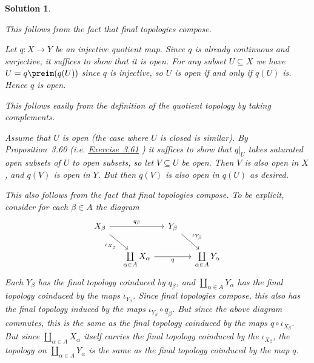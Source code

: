 \documentclass[article, a4paper, 11pt, oneside]{memoir}
\numberwithin{equation}{chapter}
\newcommand{\RNum}[1]{\uppercase\expandafter{\romannumeral #1\relax}}
\newcommand{\exref}[1]{%
    \hyperref[ex:#1]{Exercise~#1}%
}
\theoremstyle{nonumberplain}
\newtheorem{solution}{Solution}
\begin{document}
\begin{solution}
\begin{solutionsec}
    \item This follows from the fact that final topologies compose.

    \item Let $q \colon X \to Y$ be an injective quotient map. Since $q$ is already continuous and surjective, it suffices to show that it is open. For any subset $U \subseteq X$ we have $U = q\preim(q(U))$ since $q$ is injective, so $U$ is open if and only if $q(U)$ is. Hence $q$ is open.
    
    \item This follows easily from the definition of the quotient topology by taking complements.

    \item Assume that $U$ is open (the case where $U$ is closed is similar). By Proposition~3.60 (i.e. \exref{3.61}) it suffices to show that $q|_U$ takes saturated open subsets of $U$ to open subsets, so let $V \subseteq U$ be open. Then $V$ is also open in $X$, and $q(V)$ is open in $Y$. But then $q(V)$ is also open in $q(U)$ as desired.

    \item This also follows from the fact that final topologies compose. To be explicit, consider for each $\beta \in A$ the diagram
    \begin{equation*}
        \begin{tikzcd}[column sep=small]
            X_\beta
                \ar[rr, "q_\beta"]
                \ar[dr, "\iota_{X_\beta}", swap]
            && Y_\beta
                \ar[dr, "\iota_{Y_\beta}"] \\
            & \coprod\limits_{\alpha \in A} X_\alpha
                \ar[rr, "q", swap]
            && \coprod\limits_{\alpha \in A} Y_\alpha
        \end{tikzcd}
    \end{equation*}
    Each $Y_\beta$ has the final topology coinduced by $q_\beta$, and $\coprod_{\alpha \in A} Y_\alpha$ has the final topology coinduced by the maps $\iota_{Y_\beta}$. Since final topologies compose, this also has the final topology induced by the maps $\iota_{Y_\beta} \circ q_\beta$. But since the above diagram commutes, this is the same as the final topology coinduced by the maps $q \circ \iota_{X_\beta}$. But since $\coprod_{\alpha \in A} X_\alpha$ itself carries the final topology coinduced by the $\iota_{X_\beta}$, the topology on $\coprod_{\alpha \in A} Y_\alpha$ is the same as the final topology coinduced by the map $q$.
\end{solutionsec}
\end{solution}
\end{document}
